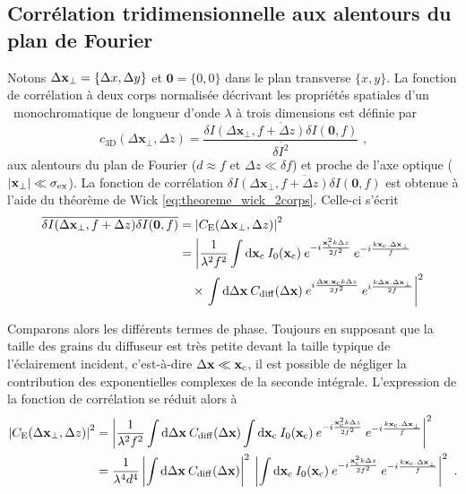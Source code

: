 \subsection{Corrélation tridimensionnelle aux alentours du plan de Fourier}
Notons $\Delta\mathbf{x}_{\perp}=\lbrace \Delta x, \Delta y\rbrace$ et $\mathbf{0}=\lbrace 0,0 \rbrace$ dans le plan transverse $\lbrace x,y \rbrace$. La fonction de corrélation à deux corps normalisée décrivant les propriétés spatiales d'un \speckle\ monochromatique de longueur d'onde $\lambda$ à trois dimensions est définie par 
\begin{equation}
c_{\mathrm{3D}}(\Delta \mathbf{x}_{\perp},\Delta z)=\frac{\overline{\delta I(\Delta \mathbf{x}_{\perp}, f+\Delta z) \delta I(\mathbf{0}, f)}}{\overline{\delta I^2}} \text{ ,}
\end{equation}
aux alentours du plan de Fourier ($d\approx f$ et $\Delta z \ll \delta f$) et proche de l'axe optique ($|\mathbf{x}_{\perp}|\ll \sigma_{\mathrm{ex}}$). La fonction de corrélation $\overline{\delta I(\Delta\mathbf{x}_{\perp},f+\Delta z) \delta I(\mathbf{0}, f)}$ est obtenue à l'aide du théorème de Wick \ref{eq:theoreme_wick_2corps}. Celle-ci s'écrit
\begin{align}
\overline{\delta I (\Delta\mathbf{x}_{\perp}, f+\Delta z) \delta I(\mathbf{0},f)} &= {\left|C_{\mathrm{E}}(\Delta\mathbf{x}_{\perp},\Delta z) \right|}^2 \\
&= \left| \frac{1}{\lambda^2 f^2} \int{\mathop{}\mathopen{}\mathrm{d}\mathbf{x}_{\mathrm{c}}\: I_0(\mathbf{x}_{\mathrm{c}}) \: e^{-i\frac{\mathbf{x}_{\mathrm{c}}^2 k \Delta z}{2f^2}} \: e^{-i\frac{k \mathbf{x}_{\mathrm{c}}. \Delta\mathbf{x}_{\perp}}{f}}}\right. \\
&\nonumber \quad\times \left.\int{\mathop{}\mathopen{}\mathrm{d}\Delta\mathbf{x}\: C_{\mathrm{diff}}(\Delta\mathbf{x}) \: e^{i\frac{\Delta\mathbf{x}. \mathbf{x}_{\mathrm{c}}k \Delta z}{2 f^2}} \: e^{i\frac{k\Delta\mathbf{x}. \Delta\mathbf{x}_{\perp}}{2f}}} \right|^2
\end{align}

Comparons alors les différents termes de phase. Toujours en supposant que la taille des grains du diffuseur est très petite devant la taille typique de l'éclairement incident, c'est-à-dire $\Delta\mathbf{x} \ll \mathbf{x}_{\mathrm{c}}$, il est possible de négliger la contribution des exponentielles complexes de la seconde intégrale. L'expression de la fonction de corrélation se réduit alors à
\begin{align}
{\left| C_{\mathrm{E}}(\Delta \mathbf{x}_{\perp} ,\Delta z)\right|}^2 &= {\left| \frac{1}{\lambda^2 f^2}  \int{\mathop{}\mathopen{}\mathrm{d}\Delta\mathbf{x}\: C_{\mathrm{diff}}(\Delta\mathbf{x})} \int{\mathop{}\mathopen{}\mathrm{d}\mathbf{x}_{\mathrm{c}}\: I_0(\mathbf{x}_{\mathrm{c}}) \: e^{-i\frac{\mathbf{x}_{\mathrm{c}}^2 k \Delta z}{2f^2}} \: e^{-i \frac{k \mathbf{x}_{\mathrm{c}}. \Delta\mathbf{x}_{\perp}}{f}}} \right|}^2 \\
&= \frac{1}{\lambda^4 d^4} \left|\int{\mathop{}\mathopen{}\mathrm{d}\Delta\mathbf{x}\: C_{\mathrm{diff}}(\Delta\mathbf{x})}\right|^2 \: \left|\int{\mathop{}\mathopen{}\mathrm{d}\mathbf{x}_{\mathrm{c}}\: I_0(\mathbf{x}_{\mathrm{c}}) \: e^{-i\frac{\mathbf{x}_{\mathrm{c}}^2 k\Delta z}{2f^2}} \: e^{-i\frac{k\mathbf{x}_{\mathrm{c}}.\Delta\mathbf{x}_{\perp}}{f}}} \right|^2 \text{ .}
\end{align}

